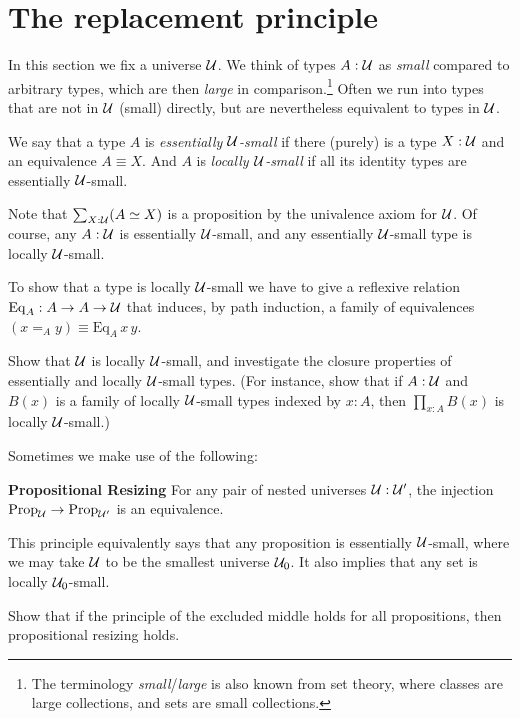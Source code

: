 \section{The replacement principle}
\label{sec:replacement}

In this section we fix a universe ${\mathcal{U}}$.
We think of types $A:{\mathcal{U}}$ as \emph{small} compared to arbitrary types,
which are then \emph{large} in comparison.\footnote{%
  The terminology \emph{small}/\emph{large} is also known from set theory,
  where classes are large collections,
  and sets are small collections.}
Often we run into types that are not in ${\mathcal{U}}$ (small) directly,
but are nevertheless equivalent to types in ${\mathcal{U}}$.
\begin{definition}\label{def:ess-loc-small}
  We say that a type $A$ is \emph{essentially ${\mathcal{U}}$-small} if there
  (purely) is a type $X:{\mathcal{U}}$ and an equivalence $A \equiv
  X$. And $A$ is \emph{locally ${\mathcal{U}}$-small} if all its identity types
  are essentially ${\mathcal{U}}$-small.
\end{definition}
Note that $\sum_{X:{\mathcal{U}}}(A \simeq X)$ is a proposition by the univalence axiom for ${\mathcal{U}}$.
Of course, any $A:{\mathcal{U}}$ is essentially ${\mathcal{U}}$-small,
and any essentially ${\mathcal{U}}$-small type is locally ${\mathcal{U}}$-small.

To show that a type is locally ${\mathcal{U}}$-small
we have to give a reflexive relation
$\mathrm{Eq}_A : A \to A \to {\mathcal{U}}$
that induces, by path induction, a family of equivalences
$(x=_Ay) \equiv \mathrm{Eq}_A\,x\,y$.

\begin{xca}
  Show that ${\mathcal{U}}$ is locally ${\mathcal{U}}$-small, and investigate
  the closure properties of essentially and locally ${\mathcal{U}}$-small types.
  (For instance, show that if $A:{\mathcal{U}}$ and $B(x)$ is a family of locally ${\mathcal{U}}$-small
  types indexed by $x:A$, then $\prod_{x:A}B(x)$ is locally ${\mathcal{U}}$-small.)
\end{xca}

Sometimes we make use of the following: %
\begin{principle}
  \label{pri:prop-resizing}
  {\bf Propositional Resizing} 
  For any pair of nested universes ${\mathcal{U}}:{\mathcal{U}}'$, the injection
  $\mathrm{Prop}_{\mathcal{U}} \to \mathrm{Prop}_{{\mathcal{U}}'}$ is an equivalence.
\end{principle}
\begin{remark}
  This principle equivalently says that any proposition is essentially ${\mathcal{U}}$-small,
  where we may take ${\mathcal{U}}$ to be the smallest universe ${\mathcal{U}}_0$.
  It also implies that any set is locally ${\mathcal{U}}_0$-small.
\end{remark}
\begin{xca}\label{xca:lem-prop-sizing}
  Show that if the principle of the excluded middle holds for all propositions,
  then propositional resizing holds.
\end{xca}

